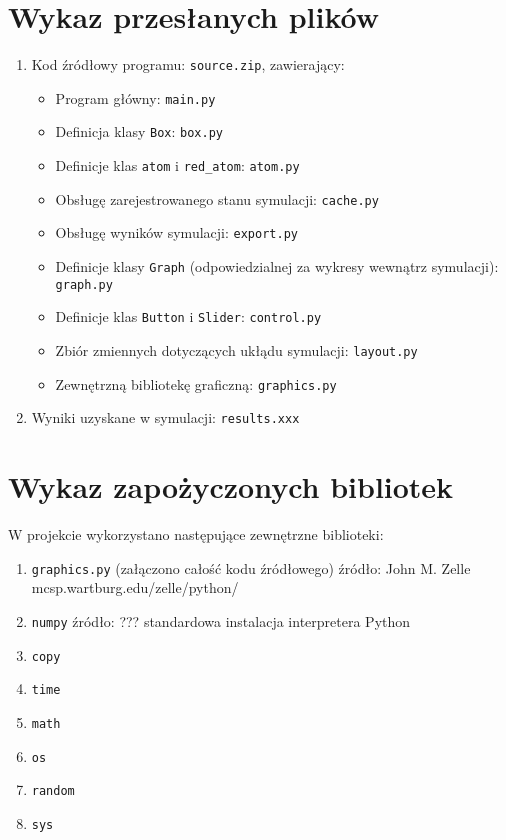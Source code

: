 \documentclass{article}
\begin{document}
\section{Wykaz przesłanych plików}
    \begin{enumerate}
        \item Kod źródłowy programu: \verb+source.zip+, zawierający:
        \begin{itemize}
            \item Program główny: \verb+main.py+
            \item Definicja klasy \verb+Box+: \verb+box.py+
            \item Definicje klas \verb+atom+ i \verb+red_atom+: \verb+atom.py+
            \item Obsługę zarejestrowanego stanu symulacji: \verb+cache.py+
            \item Obsługę wyników symulacji: \verb+export.py+
            \item Definicje klasy \verb+Graph+ (odpowiedzialnej za wykresy wewnątrz symulacji): \verb+graph.py+
            \item Definicje klas \verb+Button+ i \verb+Slider+: \verb+control.py+
            \item Zbiór zmiennych dotyczących ukłądu symulacji: \verb+layout.py+
            \item Zewnętrzną bibliotekę graficzną: \verb+graphics.py+
        \end{itemize}
        \item Wyniki uzyskane w symulacji: \verb+results.xxx+
    \end{enumerate}
\section{Wykaz zapożyczonych bibliotek}
W projekcie wykorzystano następujące zewnętrzne biblioteki:
    \begin{enumerate}
        \item \verb+graphics.py+ (załączono całość kodu źródłowego) źródło: John M. Zelle mcsp.wartburg.edu/zelle/python/
        \item \verb+numpy+ źródło: ??? standardowa instalacja interpretera Python
        \item \verb+copy+
        \item \verb+time+
        \item \verb+math+
        \item \verb+os+
        \item \verb+random+
        \item \verb+sys+
    \end{enumerate}
\end{document}
